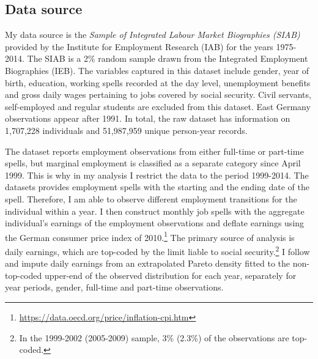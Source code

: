 \documentclass[12pt, a4paper]{article}
\let\Oldsubsection\subsection
\renewcommand{\subsection}{\FloatBarrier\Oldsubsection}
\begin{document}

\subsection{Data source}\label{Sec:data_source}

My data source is the \emph{Sample of Integrated Labour Market Biographies (SIAB)} provided by the Institute for Employment Research (IAB) for the years 1975-2014. The SIAB is a 2\% random sample drawn from the Integrated Employment Biographies (IEB). The variables captured in this dataset include gender, year of birth, education, working spells recorded at the day level, unemployment benefits and gross daily wages pertaining to jobs covered by social security. Civil servants, self-employed and regular students are excluded from this dataset. East Germany observations appear after 1991. In total, the raw dataset has information on 1,707,228 individuals and 51,987,959 unique person-year records.

The dataset reports employment observations from either full-time or part-time spells, but marginal employment is classified as a separate category since April 1999. This is why in my analysis I restrict the data to the period 1999-2014. The datasets provides employment spells with the starting and the ending date of the spell. Therefore, I am able to observe different employment transitions for the individual within a year. I then construct monthly job spells with the aggregate individual's earnings of the employment observations and deflate earnings using the German consumer price index of 2010.\footnote{\url{https://data.oecd.org/price/inflation-cpi.htm}} The primary source of analysis is daily earnings, which are top-coded by the limit liable to social security.\footnote{In the 1999-2002 (2005-2009) sample, 3\% (2.3\%) of the observations are top-coded.} I
follow \cite{DaHrMa14} and impute daily earnings from an extrapolated Pareto density fitted to the non-top-coded upper-end of the observed distribution for each year, separately for year periods, gender, full-time and part-time observations. 

\end{document}

